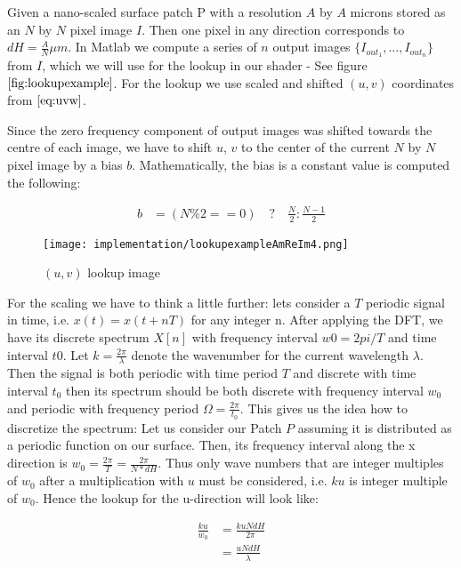 Given a nano-scaled surface patch P with a resolution $A$ by $A$ microns stored as an $N$ by $N$ pixel image $I$.
Then one pixel in any direction corresponds to $dH = \frac{A}{N} \mu m$. 
In Matlab we compute a series of $n$ output images $\{I_{out_1},...,I_{out_n}\}$ from $I$, which we will use for the lookup in our shader - See figure $\ref{fig:lookupexample}$. For the lookup we use scaled and shifted $(u,v)$ coordinates from $\ref{eq:uvw}$. 

Since the zero frequency component of output images was shifted towards the centre of each image, we have to shift $u$, $v$ to the center of the current $N$ by $N$ pixel image by a bias $b$. Mathematically, the bias is a constant value is computed the following:

\begin{align}
    b
    &= (N \% 2 == 0) \quad ? \quad \frac{N}{2} : \frac{N-1}{2}
\label{eq:bias}
\end{align}

\begin{figure}[H]
  \centering
  \texttt{[image: implementation/lookupexampleAmReIm4.png]}
  \caption{$(u,v)$ lookup image}
\label{fig:lookupexample}
\end{figure}

For the scaling we have to think a little further: lets consider a $T$ periodic signal in time, i.e. $x(t) = x(t+nT)$ for any integer n. After applying the DFT, we have its discrete spectrum $X[n]$ with frequency interval $w0 = 2pi / T$ and time interval $t0$. Let $k = \frac{2 \pi}{\lambda}$ denote the wavenumber for the current wavelength $\lambda$.
Then the signal is both periodic with time period $T$ and discrete with time interval $t_0$ then its spectrum should be both discrete with frequency interval $w_0$ and periodic with frequency period $\Omega = \frac{2 \pi}{t_0}$. This gives us the idea how to discretize the spectrum: Let us consider our Patch $P$ assuming it is distributed as a periodic function on our surface. Then, its frequency interval along the x direction is $w_0 = \frac{2 \pi}{T} = \frac{2 \pi}{N*dH}$. 
Thus only wave numbers that are integer multiples of $w_0$ after a multiplication with $u$ must be considered, i.e. $ku$ is integer multiple of $w_0$. Hence the lookup for the u-direction will look like:

\begin{align}
    \frac{ku}{w_0} 
    &= \frac{ku N dH}{2 \pi} \\
    &= \frac{u N dH}{\lambda}
\label{eq:scalelook}
\end{align}

